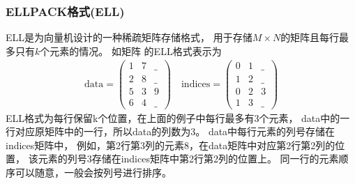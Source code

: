 \subsubsection{ELLPACK格式(ELL)}
ELL是为向量机设计的一种稀疏矩阵存储格式，\cite{grimes1979itpack}
用于存储$M\times N$的矩阵且每行最多只有$k$个元素的情况。
如矩阵
的ELL格式表示为\cite{bell2008spmv}
\begin{align*}
\mathrm{data}=\begin{pmatrix}
1 & 7 & \_\\
2 & 8 & \_\\
5 & 3 & 9 \\
6 & 4 & \_
\end{pmatrix}
\quad
\mathrm{indices}=\begin{pmatrix}
0 & 1 & \_\\
1 & 2 & \_\\
0 & 2 & 3\\
1 & 3 & \_
\end{pmatrix}
\end{align*}
ELL格式为每行保留k个位置，在上面的例子中每行最多有3个元素，
data中的一行对应原矩阵中的一行，所以data的列数为3。
data中每行元素的列号存储在indices矩阵中，
例如，第2行第3列的元素8，在data矩阵中对应第2行第2列的位置，
该元素的列号3存储在indices矩阵中第2行第2列的位置上。
同一行的元素顺序可以随意，一般会按列号进行排序。


